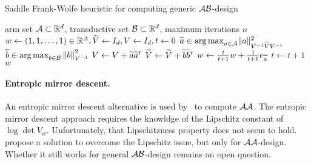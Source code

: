 


\begin{algorithm}[ht]
\centering
\caption{Saddle Frank-Wolfe heuristic for computing generic $\mathcal{A}\mathcal{B}$-design}
\label{alg:fw_ab}
\begin{algorithmic}
    arm set $\mathcal{A}\subset\mathbb{R}^d$, transductive set $\mathcal{B}\subset\mathbb{R}^d$, maximum iterations $n$
    $w \leftarrow{} (1, 1, \ldots, 1)\in\mathbb{R}^A, \widetilde{V} \leftarrow{} I_d, V \leftarrow{} I_d, t \leftarrow{} 0$
        \State $\widetilde{a}\in\operatorname*{arg\,max}_{a\in\mathcal{A}}  \lVert a\rVert_{V^{-1} \widetilde{V} V^{-1} }^2$
        \State $\widetilde{b}\in\operatorname*{arg\,max}_{b\in\mathcal{B}}\left\lVert b\right\rVert^2_{V^{-1}}$
        \State $V \leftarrow{} V + \widetilde{a}\widetilde{a}^{\mathsf{\scriptscriptstyle T}}$
		\State $\widetilde{V} \leftarrow{} \widetilde{V} + \widetilde{b}\widetilde{b}^{\mathsf{\scriptscriptstyle T}}$
        \State $w \leftarrow{} \frac{t}{t+1}w+\frac{1}{t+1}e_{\widetilde{a}}$
        \State $t \leftarrow{} t+1$
   \EndWhile
    $w$
\end{algorithmic}
\end{algorithm}

\paragraph{Entropic mirror descent.}
An entropic mirror descent alternative is used by~\citet{tao2018alba} to compute $\mathcal{A}\mathcal{A}$. The entropic mirror descent approach requires the knowldge of the Lipschitz constant of $\log\det V_w$. Unfortunately, that Lipschitzness property does not seem to hold. \citet{lu2018convex} propose a solution to overcome the Lipschitz issue, but only for $\mathcal{A}\mathcal{A}$-design. Whether it still works for general $\mathcal{A}\mathcal{B}$-design remains an open question.

